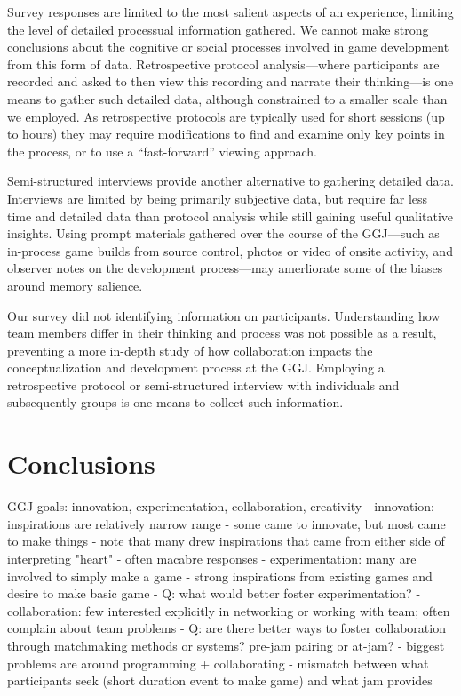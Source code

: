 \documentclass{sig-alternate}
\begin{document}
Survey responses are limited to the most salient aspects of an experience, limiting the level of detailed processual information gathered. We cannot make strong conclusions about the cognitive or social processes involved in game development from this form of data. Retrospective protocol analysis---where participants are recorded and asked to then view this recording and narrate their thinking---is one means to gather such detailed data, although constrained to a smaller scale than we employed. As retrospective protocols are typically used for short sessions (up to hours) they may require modifications to find and examine only key points in the process, or to use a ``fast-forward'' viewing approach. 

Semi-structured interviews provide another alternative to gathering detailed data. Interviews are limited by being primarily subjective data, but require far less time and detailed data than protocol analysis while still gaining useful qualitative insights. Using prompt materials gathered over the course of the GGJ---such as in-process game builds from source control, photos or video of onsite activity, and observer notes on the development process---may amerliorate some of the biases around memory salience.

Our survey did not identifying information on participants. Understanding how team members differ in their thinking and process was not possible as a result, preventing a more in-depth study of how collaboration impacts the conceptualization and development process at the GGJ. Employing a retrospective protocol or semi-structured interview with individuals and subsequently groups is one means to collect such information.


\section{Conclusions}
GGJ goals: innovation, experimentation, collaboration, creativity
- innovation: inspirations are relatively narrow range
	- some came to innovate, but most came to make things
	- note that many drew inspirations that came from either side of interpreting "heart" - often macabre responses
- experimentation: many are involved to simply make a game
	- strong inspirations from existing games and desire to make basic game
	- Q: what would better foster experimentation?
- collaboration: few interested explicitly in networking or working with team; often complain about team problems
	- Q: are there better ways to foster collaboration through matchmaking methods or systems? pre-jam pairing or at-jam?
- biggest problems are around programming + collaborating
	- mismatch between what participants seek (short duration event to make game) and what jam provides
\end{document}
